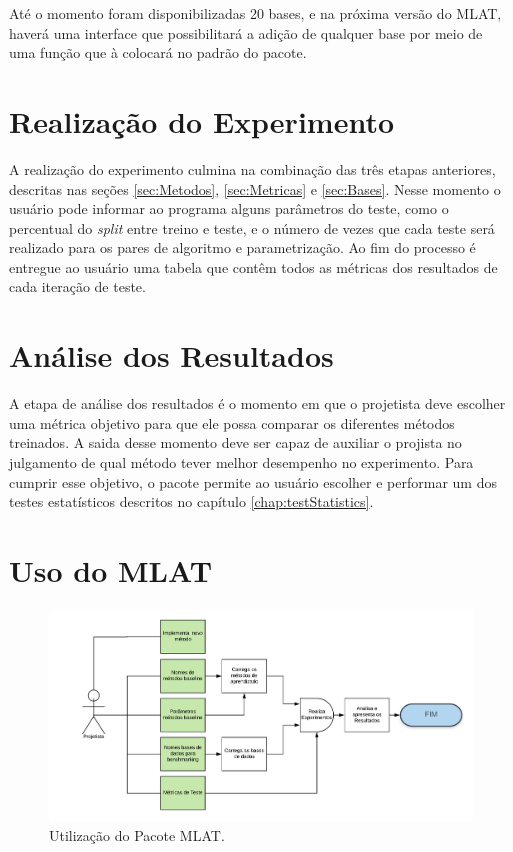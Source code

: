 Até o momento foram disponibilizadas 20 bases, e na próxima versão do MLAT, haverá uma interface que possibilitará a adição de qualquer base por meio de uma função que à colocará no padrão do pacote.

\section{Realização do Experimento}
A realização do experimento culmina na combinação das três etapas anteriores, descritas nas seções \ref{sec:Metodos}, \ref{sec:Metricas} e \ref{sec:Bases}. Nesse momento o usuário pode informar ao programa alguns parâmetros do teste, como o percentual do \textit{split} entre treino e teste, e o número de vezes que cada teste será realizado para os pares de algoritmo e parametrização. Ao fim do processo é entregue ao usuário uma tabela que contêm todos as métricas dos resultados de cada iteração de teste.

\section{Análise dos  Resultados}
A etapa de análise dos resultados é o momento em que o projetista deve escolher uma métrica objetivo para que ele possa comparar os diferentes métodos treinados. A saida desse momento deve ser capaz de auxiliar o projista no julgamento de qual método tever melhor desempenho no experimento. Para cumprir esse objetivo, o pacote permite ao usuário escolher e performar um dos testes estatísticos descritos no capítulo \ref{chap:testStatistics}. 



\section{Uso do MLAT}

\begin{figure}[!htb]
	\centering
	\includegraphics[width=\textwidth]{./04-figuras/UseCase.png}
	\caption{Utilização do Pacote MLAT.} 
	\label{fig:BuildingMLModel}
\end{figure}


